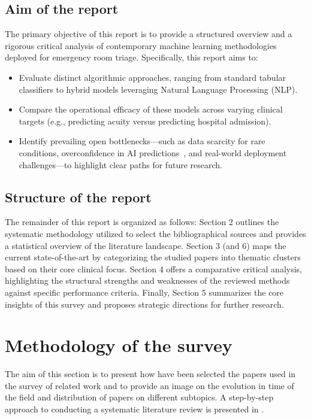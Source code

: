 \documentclass{article}
\begin{document}
\subsection{Aim of the report}
The primary objective of this report is to provide a structured overview and a rigorous critical analysis of contemporary machine learning methodologies deployed for emergency room triage. Specifically, this report aims to:
\begin{itemize}
    \item Evaluate distinct algorithmic approaches, ranging from standard tabular classifiers to hybrid models leveraging Natural Language Processing (NLP).
    \item Compare the operational efficacy of these models across varying clinical targets (e.g., predicting acuity versus predicting hospital admission).
    \item Identify prevailing open bottlenecks—such as data scarcity for rare conditions, overconfidence in AI predictions~\cite{Salman2021}, and real-world deployment challenges—to highlight clear paths for future research.
\end{itemize}

\subsection{Structure of the report}
The remainder of this report is organized as follows: Section 2 outlines the systematic methodology utilized to select the bibliographical sources and provides a statistical overview of the literature landscape. Section 3 (and 6) maps the current state-of-the-art by categorizing the studied papers into thematic clusters based on their core clinical focus. Section 4 offers a comparative critical analysis, highlighting the structural strengths and weaknesses of the reviewed methods against specific performance criteria. Finally, Section 5 summarizes the core insights of this survey and proposes strategic directions for further research.


\section{Methodology of the survey}

The aim of this section is to present how have been selected the papers used in the survey of related work and to provide an image on the evolution in time of the field and distribution of papers on different subtopics. A step-by-step approach to conducting a systematic literature review is presented in \cite{Rivera2022}.
\end{document}
